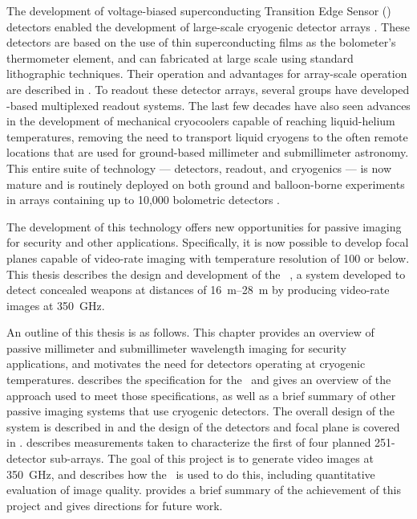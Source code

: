 The development of voltage-biased superconducting Transition Edge Sensor (\TES) detectors enabled the development of large-scale cryogenic detector arrays \cite{irwin_application_1995}.
These detectors are based on the use of thin superconducting films as the bolometer's thermometer element, and can fabricated at large scale using standard lithographic techniques.
Their operation and advantages for array-scale operation are described in .
To readout these detector arrays, several groups have developed \SQUID-based multiplexed readout systems.
The last few decades have also seen advances in the development of mechanical cryocoolers capable of reaching liquid-helium temperatures, removing the need to transport liquid cryogens to the often remote locations that are used for ground-based millimeter and submillimeter astronomy.
This entire suite of technology --- detectors, readout, and cryogenics --- is now mature and is routinely deployed on both ground and balloon-borne experiments in arrays containing up to 10,000 bolometric detectors \cite{holland_scuba-2:_2013}.

The development of this technology offers new opportunities for passive imaging for security and other applications.
Specifically, it is now possible to develop focal planes capable of video-rate imaging with temperature resolution of \SI{100}{\mK} or below.
This thesis describes the design and development of the \NIST\ \Imager, a system developed to detect concealed weapons at distances of \SIrange{16}{28}{\m} by producing video-rate images at \SI{350}{\GHz}.

An outline of this thesis is as follows.
This chapter provides an overview of passive millimeter and submillimeter wavelength imaging for security applications, and motivates the need for detectors operating at cryogenic temperatures.
 describes the specification for the \Imager\ and gives an overview of the approach used to meet those specifications, as well as a brief summary of other passive imaging systems that use cryogenic detectors.
The overall design of the system is described in  and the design of the detectors and focal plane is covered in .
 describes measurements taken to characterize the first of four planned 251-detector sub-arrays.
The goal of this project is to generate video images at \SI{350}{\GHz}, and  describes how the \Imager\ is used to do this, including quantitative evaluation of image quality.
 provides a brief summary of the achievement of this project and gives directions for future work.

